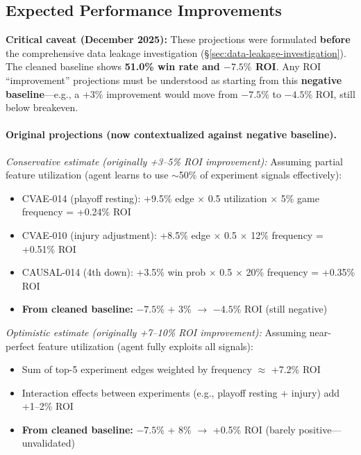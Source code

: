 \subsection{Expected Performance Improvements}

\textbf{Critical caveat (December 2025):} These projections were formulated \textbf{before} the comprehensive data leakage investigation (\S\ref{sec:data-leakage-investigation}). The cleaned baseline shows \textbf{51.0\% win rate and $-7.5\%$ ROI}. Any ROI ``improvement'' projections must be understood as starting from this \textbf{negative baseline}---e.g., a +3\% improvement would move from $-7.5\%$ to $-4.5\%$ ROI, still below breakeven.

\paragraph{Original projections (now contextualized against negative baseline).}

\textit{Conservative estimate (originally +3--5\% ROI improvement):}
Assuming partial feature utilization (agent learns to use $\sim$50\% of experiment signals effectively):
\begin{itemize}
  \item CVAE-014 (playoff resting): +9.5\% edge $\times$ 0.5 utilization $\times$ 5\% game frequency = +0.24\% ROI
  \item CVAE-010 (injury adjustment): +8.5\% edge $\times$ 0.5 $\times$ 12\% frequency = +0.51\% ROI
  \item CAUSAL-014 (4th down): +3.5\% win prob $\times$ 0.5 $\times$ 20\% frequency = +0.35\% ROI
  \item \textbf{From cleaned baseline:} $-7.5\%$ + 3\% $\to$ $-4.5\%$ ROI (still negative)
\end{itemize}

\textit{Optimistic estimate (originally +7--10\% ROI improvement):}
Assuming near-perfect feature utilization (agent fully exploits all signals):
\begin{itemize}
  \item Sum of top-5 experiment edges weighted by frequency $\approx$ +7.2\% ROI
  \item Interaction effects between experiments (e.g., playoff resting + injury) add +1--2\% ROI
  \item \textbf{From cleaned baseline:} $-7.5\%$ + 8\% $\to$ +0.5\% ROI (barely positive---unvalidated)
\end{itemize}

